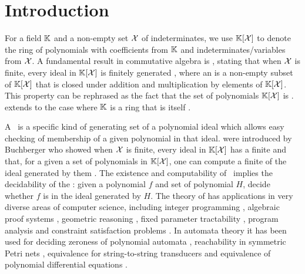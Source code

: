 \section{Introduction}
\label{sec:intro}
\AP For a field $\mathbb{K}$ and a non-empty set $\mathcal{X}$ of indeterminates, we use
$\mathbb{K}[\mathcal{X}]$ to denote the ring of polynomials with coefficients from $\mathbb{K}$
and indeterminates/variables from $\mathcal{X}$. A fundamental result in commutative
algebra is , stating that when $\mathcal{X}$ is finite,
every ideal in $\mathbb{K}[\mathcal{X}]$ is finitely generated \cite{HILB1890}, where an
 is a non-empty subset of $\mathbb{K}[\mathcal{X}]$ that is closed under
addition and multiplication by elements of $\mathbb{K}[\mathcal{X}]$. This property can
be rephrased as the fact that the set of polynomials $\mathbb{K}[\mathcal{X}]$ is
.  extends to the case where $\mathbb{K}$
is a ring that is itself  \cite[Theorem 4.1]{Lang02}.

\AP A \Grb\ is a specific kind of generating set of a polynomial ideal
which allows easy checking of membership of a given polynomial in that ideal.
 were introduced by Buchberger who showed when $\mathcal{X}$ is
finite, every ideal in $\mathbb{K}[\mathcal{X}]$ has a finite  and
that, for a given a set of polynomials in $\mathbb{K}[\mathcal{X}]$, one can compute a
finite  of the ideal generated by them \cite{BUCH76}. The
existence and computability of \Grbs\ implies the decidability of the
: given a polynomial $f$ and set of polynomial
$H$, decide whether $f$ is in the ideal generated by $H$. The theory of
 has applications in very diverse areas of computer
science, including integer programming \cite{Sturmfels96}, algebraic proof
systems \cite{algProof}, geometric reasoning \cite{Cox2015chGeom}, fixed
parameter tractability \cite{ACDM22}, program analysis \cite{SSM04} and
constraint satisfaction problems \cite{Mas21}.
In automata theory it has been used for deciding zeroness of polynomial
automata \cite{BEDUSHWO17}, reachability in symmetric Petri nets \cite{MAME82},
equivalence for string-to-string transducers \cite{HONKALA00} and equivalence
of polynomial differential equations \cite{CLEMENTE24}. 

